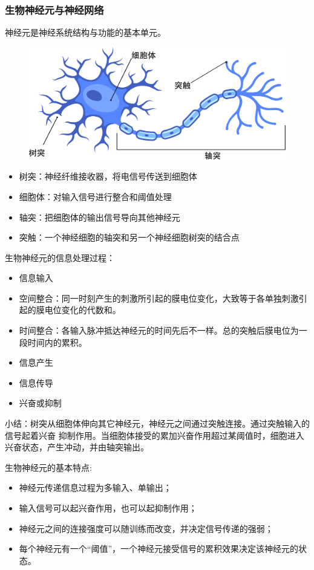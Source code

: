 \subsubsection{生物神经元与神经网络}
神经元是神经系统结构与功能的基本单元。
\begin{figure}[htbp]
    \centering
    \includegraphics[width = .5\textwidth]{image/NeuronFreeVectorIllustration.pdf}
\end{figure}
\begin{itemize}
    \item 树突：神经纤维接收器，将电信号传送到细胞体
    \item 细胞体：对输入信号进行整合和阈值处理
    \item 轴突：把细胞体的输出信号导向其他神经元
    \item 突触：一个神经细胞的轴突和另一个神经细胞树突的结合点
\end{itemize}
\begin{note}
    生物神经元的信息处理过程：
    \begin{itemize}
        \item 信息输入
        \item 空间整合：同一时刻产生的刺激所引起的膜电位变化，大致等于各单独刺激引起的膜电位变化的代数和。
        \item 时间整合：各输入脉冲抵达神经元的时间先后不一样。总的突触后膜电位为一段时间内的累积。
        \item 信息产生
        \item 信息传导
        \item 兴奋或抑制
    \end{itemize}
    小结：树突从细胞体伸向其它神经元，神经元之间通过突触连接。通过突触输入的信号起着兴奋 抑制作用。当细胞体接受的累加兴奋作用超过某阈值时，细胞进入兴奋状态，产生冲动，并由轴突输出。
\end{note}
\begin{note}
    生物神经元的基本特点:
    \begin{itemize}
        \item 神经元传递信息过程为多输入、单输出；
        \item 输入信号可以起兴奋作用，也可以起抑制作用；
        \item 神经元之间的连接强度可以随训练而改变，并决定信号传递的强弱；
        \item 每个神经元有一个“阈值”，一个神经元接受信号的累积效果决定该神经元的状态。
    \end{itemize}
\end{note}
